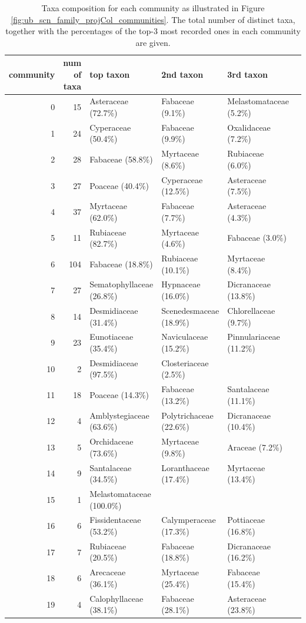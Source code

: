 \begin{table}
\begin{table}[H]
  \caption[Taxa composition for each community as illustrated in Figure \ref{fig:ub_scn_family_projCol_communities}.]{Taxa composition for each community as illustrated in Figure \ref{fig:ub_scn_family_projCol_communities}. The total number of distinct taxa, together with the percentages of the top-3 most recorded ones in each community are given.}
  \begin{center}
  \begin{tabular}{r r l l l l}
      community & num of taxa & top taxon & 2nd taxon & 3rd taxon \\
      \hline
0 & 15 & Asteraceae (72.7\%) & Fabaceae (9.1\%) & Melastomataceae (5.2\%) \\
1 & 24 & Cyperaceae (50.4\%) & Fabaceae (9.9\%) & Oxalidaceae (7.2\%) \\
2 & 28 & Fabaceae (58.8\%) & Myrtaceae (8.6\%) & Rubiaceae (6.0\%) \\
3 & 27 & Poaceae (40.4\%) & Cyperaceae (12.5\%) & Asteraceae (7.5\%) \\
4 & 37 & Myrtaceae (62.0\%) & Fabaceae (7.7\%) & Asteraceae (4.3\%) \\
5 & 11 & Rubiaceae (82.7\%) & Myrtaceae (4.6\%) & Fabaceae (3.0\%) \\
6 & 104 & Fabaceae (18.8\%) & Rubiaceae (10.1\%) & Myrtaceae (8.4\%) \\
7 & 27 & Sematophyllaceae (26.8\%) & Hypnaceae (16.0\%) & Dicranaceae (13.8\%) \\
8 & 14 & Desmidiaceae (31.4\%) & Scenedesmaceae (18.9\%) & Chlorellaceae (9.7\%) \\
9 & 23 & Eunotiaceae (35.4\%) & Naviculaceae (15.2\%) & Pinnulariaceae (11.2\%) \\
10 & 2 & Desmidiaceae (97.5\%) & Closteriaceae (2.5\%) \\
11 & 18 & Poaceae (14.3\%) & Fabaceae (13.2\%) & Santalaceae (11.1\%) \\
12 & 4 & Amblystegiaceae (63.6\%) & Polytrichaceae (22.6\%) & Dicranaceae (10.4\%) \\
13 & 5 & Orchidaceae (73.6\%) & Myrtaceae (9.8\%) & Araceae (7.2\%) \\
14 & 9 & Santalaceae (34.5\%) & Loranthaceae (17.4\%) & Myrtaceae (13.4\%) \\
15 & 1 & Melastomataceae (100.0\%) \\
16 & 6 & Fissidentaceae (53.2\%) & Calymperaceae (17.3\%) & Pottiaceae (16.8\%) \\
17 & 7 & Rubiaceae (20.5\%) & Fabaceae (18.8\%) & Dicranaceae (16.2\%) \\
18 & 6 & Arecaceae (36.1\%) & Myrtaceae (25.4\%) & Fabaceae (15.4\%) \\
19 & 4 & Calophyllaceae (38.1\%) & Fabaceae (28.1\%) & Asteraceae (23.8\%) \\
      \hline
  \end{tabular}
  \label{table:ub_scn_family_projCol_composition}
  \end{center}
\end{table}
\end{table}


